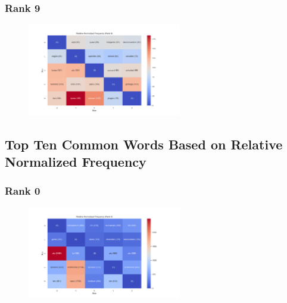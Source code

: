 \documentclass[11pt]{article}
\begin{document}
\subsubsection{Rank 9}
\begin{center}


\resizebox{\columnwidth}{!}
{
\TTRNFTable
}
\begin{figure}[h!]
  \includegraphics[width=0.6\textwidth]{figs/top_ten_rnf/rnf_t_rank_9.png}
\end{figure}
\end{center}

\pagebreak

\subsection{Top Ten Common Words Based on Relative Normalized Frequency}
\subsubsection{Rank 0}
\begin{center}


\resizebox{\columnwidth}{!}
{
\TTRNFTable
}
\begin{figure}[h!]
  \includegraphics[width=0.6\textwidth]{figs/top_ten_rnf/rnf_w_rank_0.png}
\end{figure}
\end{center}
\end{document}
